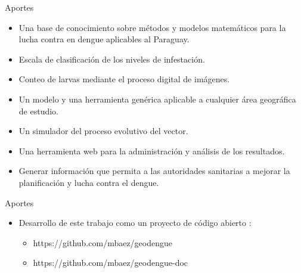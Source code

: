 \begin{frame}[c]{Aportes}
    \begin{itemize}
        \item Una base de conocimiento sobre métodos y modelos matemáticos para la lucha contra en dengue aplicables al Paraguay.
        \item Escala de clasificación de los niveles de infestación.
        \item Conteo de larvas mediante el proceso digital de imágenes.
        \item Un modelo y una herramienta genérica aplicable a cualquier área geográfica de estudio.
        \item Un simulador del proceso evolutivo del vector.
        \item Una herramienta web para la administración y análisis de los resultados.
        \item Generar información que permita a las autoridades sanitarias a mejorar la planificación y lucha contra el dengue.
    \end{itemize}
\end{frame}
\begin{frame}[t]{Aportes}
    \begin{itemize}
        \item Desarrollo de este trabajo como un proyecto de código abierto :

        \begin{itemize}
            \item https://github.com/mbaez/geodengue
            \item https://github.com/mbaez/geodengue-doc
        \end{itemize}
    \end{itemize}
\end{frame}
